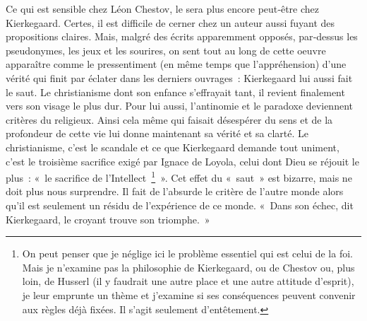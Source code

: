 \documentclass{book}
\begin{document}
Ce qui est sensible chez Léon Chestov, le sera plus encore peut‑être chez Kierkegaard. Certes, il est difficile de cerner chez un auteur aussi fuyant des propositions claires. Mais, malgré des écrits apparemment opposés, par‑dessus les pseudonymes, les jeux et les sourires, on sent tout au long de cette oeuvre apparaître comme le pressentiment (en même temps que l'appréhension) d'une vérité qui finit par éclater dans les derniers ouvrages : Kierkegaard lui aussi fait le saut. Le christianisme dont son enfance s'effrayait tant, il revient finalement vers son visage le plus dur. Pour lui aussi, l'antinomie et le paradoxe deviennent critères du religieux. Ainsi cela même qui faisait désespérer du sens et de la profondeur de cette vie lui donne maintenant sa vérité et sa clarté. Le christianisme, c'est le scandale et ce que Kierkegaard demande tout uniment, c'est le troisième sacrifice exigé par Ignace de Loyola, celui dont Dieu se réjouit le plus : « le sacrifice de l'Intellect \footnote{On peut penser que je néglige ici le problème essentiel qui est celui de la foi. Mais je n’examine pas la philosophie de Kierkegaard, ou de Chestov ou, plus loin, de Husserl (il y faudrait une autre place et une autre attitude d’esprit), je leur emprunte un thème et j’examine si ses conséquences peuvent convenir aux règles déjà fixées. Il s’agit seulement d’entêtement.} ». Cet effet du « saut » est bizarre, mais ne doit plus nous surprendre. Il fait de l'absurde le critère de l'autre monde alors qu'il est seulement un résidu de l'expérience de ce monde. « Dans son échec, dit Kierkegaard, le croyant trouve son triomphe. »
\end{document}
